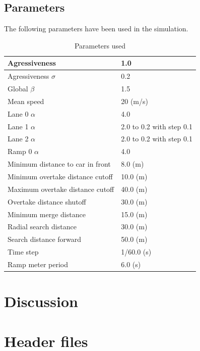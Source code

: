 \documentclass{article}
\begin{document}
  \subsection{Parameters}
    The following parameters have been used in the simulation.
    \begin{table}[H]
      \centering
      \begin{tabular}{| l | l |}
        \hline
        Agressiveness & 1.0 \\ \hline
        Agressiveness $\sigma$ & 0.2 \\ \hline
        Global $\beta$ & 1.5 \\ \hline
        Mean speed & 20 (m/s) \\ \hline
        Lane 0 $\alpha$ & 4.0 \\ \hline
        Lane 1 $\alpha$ & 2.0 to 0.2 with step 0.1 \\ \hline
        Lane 2 $\alpha$ & 2.0 to 0.2 with step 0.1 \\ \hline
        Ramp 0 $\alpha$ & 4.0 \\ \hline
        Minimum distance to car in front & 8.0 (m) \\ \hline
        Minimum overtake distance cutoff & 10.0 (m) \\ \hline
        Maximum overtake distance cutoff & 40.0 (m) \\ \hline
        Overtake distance shutoff & 30.0 (m) \\ \hline
        Minimum merge distance & 15.0 (m) \\ \hline
        Radial search distance & 30.0 (m) \\ \hline
        Search distance forward & 50.0 (m) \\ \hline
        Time step & 1/60.0 (s) \\ \hline
        Ramp meter period & 6.0 (s) \\ \hline
      \end{tabular}
      \caption{Parameters used}
      \label{tb:1}
    \end{table}

\section{Discussion}

\printbibliography
\pagebreak
\appendix

\section{Header files}
\end{document}
